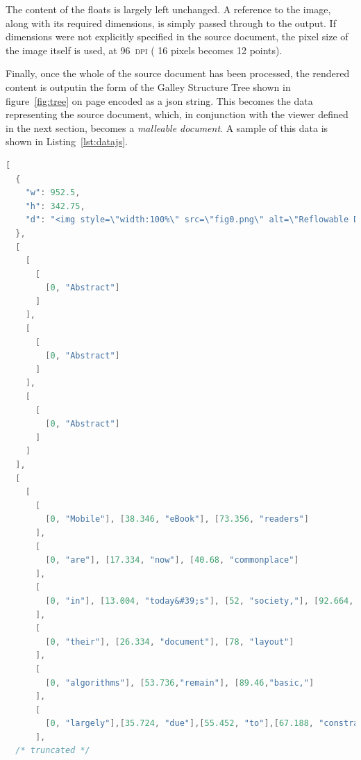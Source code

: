 The content of the floats is largely left unchanged. A reference to the image, along with its required dimensions, is simply passed through to the output. If dimensions were not explicitly specified in the source document, the pixel size of the image itself is used, at 96~\textsc{dpi} (\ie{} 16 pixels becomes 12 points).

Finally, once the whole of the source document has been processed, the rendered content is output\ed in the form of the Galley Structure Tree shown in figure~\ref{fig:tree} on page \pageref{fig:tree}\ed encoded as a \gls{json} string. This becomes the data representing the source document, which, in conjunction with the viewer defined in the next section, becomes a \emph{malleable document}. A sample of this data is shown in Listing~\ref{lst:datajs}.

\begin{lstlisting}[label=lst:datajs,captionpos=b,float,language=c,stringstyle=\color{blue},basicstyle=\ttfamily\scriptsize,caption={[Excerpt from JavaScript data file]Excerpt from JavaScript data file representing a 3-galley document. Note that the title "Abstract" is treated as any normal paragraph and, as for any paragraph, is typeset once for each galley rendering (despite there being no difference between each rendering in this case). The first rendering of the first paragraph of the abstract begins below. For brevity's sake, subsequent renderings are not shown, but since the following galleys are typeset with a different measure, the spacing and words per line will differ. At the top is an object representing a float, which contains values for \textcolor{red}width, \textcolor{red}height, and \textcolor{red}data.}]
[
  {
    "w": 952.5,
    "h": 342.75,
    "d": "<img style=\"width:100%\" src=\"fig0.png\" alt=\"Reflowable Documents Composed from\nPre-rendered Atomic Components\nAlexander J. Pinkney\nSteven R. Bagley\nDavid F. Brailsford\nDocument Engineering Lab.\nSchool of Computer Science\nUniversity of Nottingham\nNottingham, NG8 1BB, UK\n{azp|srb|dfb}@cs.nott.ac.uk\n\">"
  },
  [
    [
      [
        [0, "Abstract"]
      ]
    ],
    [
      [
        [0, "Abstract"]
      ]
    ],
    [
      [
        [0, "Abstract"]
      ]
    ]
  ],
  [
    [
      [
        [0, "Mobile"], [38.346, "eBook"], [73.356, "readers"]
      ],
      [
        [0, "are"], [17.334, "now"], [40.68, "commonplace"]
      ],
      [
        [0, "in"], [13.004, "today&#39;s"], [52, "society,"], [92.664, "but"]
      ],
      [
        [0, "their"], [26.334, "document"], [78, "layout"]
      ],
      [
        [0, "algorithms"], [53.736,"remain"], [89.46,"basic,"]
      ],
      [
        [0, "largely"],[35.724, "due"],[55.452, "to"],[67.188, "constraints"]
      ],
  /* truncated */

\end{lstlisting}



